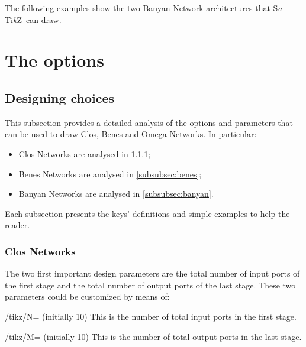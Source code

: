 \documentclass{ltxdoc}
\newcommand\Tikz{Ti\textit kZ}
\newcommand{\saTikZ}{S\textit{a}-\Tikz}
\begin{document}
The following examples show the two Banyan Network architectures that \saTikZ\ can draw.

\bgroup
{}
\begin{codeexample}[]
\end{codeexample}
\egroup

\section{The options}
\subsection{Designing choices}
This subsection provides a detailed analysis of the options and parameters that can be used to draw Clos, Benes and Omega Networks. In particular:
\begin{itemize}
\item Clos Networks are analysed in \ref{subsubsec:clos};
\item Benes Networks are analysed in \ref{subsubsec:benes};
\item Banyan Networks are analysed in \ref{subsubsec:banyan}.
\end{itemize}
Each subsection presents the keys' definitions and simple examples to help the reader. 

\subsubsection{Clos Networks}
\label{subsubsec:clos}
The two first important design parameters are the total number of input ports of the first stage and the total number of output ports of the last stage. These two parameters could be customized by means of:

\begin{key}{/tikz/N= (initially 10)}
    This is the number of total input ports in the first stage.
\end{key}

\begin{key}{/tikz/M= (initially 10)}
    This is the number of total output ports in the last stage.
\end{key}
\end{document}
